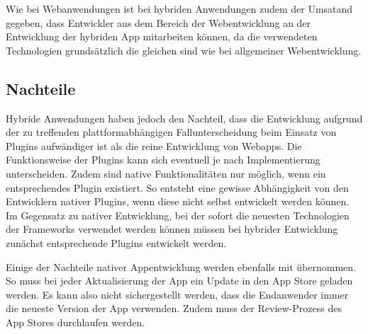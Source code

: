 Wie bei Webanwendungen ist bei hybriden Anwendungen zudem der Umsatand gegeben, dass Entwickler aus dem Bereich der Webentwicklung an der Entwicklung der hybriden App mitarbeiten können, da die verwendeten Technologien grundsätzlich die gleichen sind wie bei allgemeiner Webentwicklung. 
%
\subsection{Nachteile}
%
Hybride Anwendungen haben jedoch den Nachteil, dass die Entwicklung aufgrund der zu treffenden plattformabhängigen Fallunterscheidung beim Einsatz von Plugins aufwändiger ist als die reine Entwicklung von Webapps. Die Funktionsweise der Plugins kann sich eventuell je nach Implementierung unterscheiden. Zudem sind native Funktionalitäten nur möglich, wenn ein entsprechendes Plugin existiert. So entsteht eine gewisse Abhängigkeit von den Entwicklern nativer Plugins, wenn diese nicht selbst entwickelt werden können. Im Gegensatz zu nativer Entwicklung, bei der sofort die neuesten Technologien der Frameworks verwendet werden können müssen bei hybrider Entwicklung zunächst entsprechende Plugins entwickelt werden.

Einige der Nachteile nativer Appentwicklung werden ebenfalls mit übernommen. So muss bei jeder Aktualisierung der App ein Update in den App Store geladen werden. Es kann also nicht sichergestellt werden, dass die Endanwender immer die neueste Version der App verwenden. Zudem muss der Review-Prozess des App Stores durchlaufen werden. 
